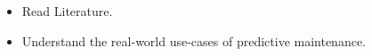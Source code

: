 \label{sec:requirment-management}
\begin{itemize}
\item Read Literature.
\item Understand the real-world use-cases of predictive maintenance.
\end{itemize}